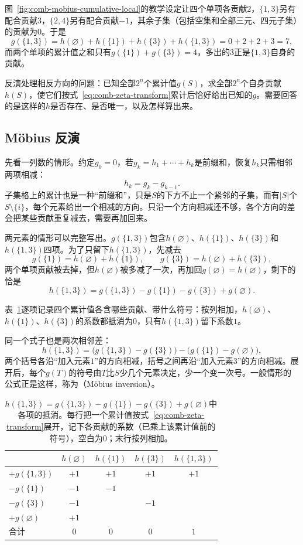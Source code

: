 图~\ref{fig:comb-mobius-cumulative-local}的教学设定让四个单项各贡献$2$，$\{1,3\}$另有配合贡献$3$，$\{2,4\}$另有配合贡献$-1$，其余子集（包括空集和全部三元、四元子集）的贡献为$0$。于是
\[
  g(\{1,3\})=h(\varnothing)+h(\{1\})+h(\{3\})+h(\{1,3\})=0+2+2+3=7,
\]
而两个单项的累计值之和只有$g(\{1\})+g(\{3\})=4$，多出的$3$正是$\{1,3\}$自身的贡献。

反演处理相反方向的问题：已知全部$2^n$个累计值$g(S)$，求全部$2^n$个自身贡献$h(S)$，使它们按式~\eqref{eq:comb-zeta-transform}累计后恰好给出已知的$g$。需要回答的是这样的$h$是否存在、是否唯一，以及怎样算出来。

\subsection{Möbius 反演}
\label{sec:graph-setfn-mobius-inversion}

先看一列数的情形。约定$g_0=0$，若$g_k=h_1+\cdots+h_k$是前缀和，恢复$h_k$只需相邻两项相减：
\[
  h_k=g_k-g_{k-1}.
\]
子集格上的累计也是一种“前缀和”，只是$S$的下方不止一个紧邻的子集，而有$|S|$个$S\setminus\{i\}$，每个元素给出一个相减的方向。只沿一个方向相减还不够，各个方向的差会把某些贡献重复减去，需要再加回来。

两元素的情形可以完整写出。$g(\{1,3\})$包含$h(\varnothing)$、$h(\{1\})$、$h(\{3\})$和$h(\{1,3\})$四项。为了只留下$h(\{1,3\})$，先减去
\[
  g(\{1\})=h(\varnothing)+h(\{1\}),\qquad g(\{3\})=h(\varnothing)+h(\{3\}),
\]
两个单项贡献被去掉，但$h(\varnothing)$被多减了一次，再加回$g(\varnothing)=h(\varnothing)$，剩下的恰是
\[
  h(\{1,3\})=g(\{1,3\})-g(\{1\})-g(\{3\})+g(\varnothing).
\]

表~\ref{tab:graph-setfn-mobius-cancellation}逐项记录四个累计值各含哪些贡献、带什么符号：按列相加，$h(\varnothing)$、$h(\{1\})$、$h(\{3\})$的系数都抵消为$0$，只有$h(\{1,3\})$留下系数$1$。

同一个式子也是两次相邻差：
\[
  h(\{1,3\})=\bigl(g(\{1,3\})-g(\{3\})\bigr)-\bigl(g(\{1\})-g(\varnothing)\bigr),
\]
两个括号各沿“加入元素$1$”的方向相减，括号之间再沿“加入元素$3$”的方向相减。展开后，每个$g(T)$的符号由$T$比$S$少几个元素决定，少一个变一次号。一般情形的公式正是这样，称为（Möbius inversion）。

\begin{table}[!htb]
  \centering
  \begin{tabular}{@{}lcccc@{}}
    \toprule
    & $h(\varnothing)$ & $h(\{1\})$ & $h(\{3\})$ & $h(\{1,3\})$ \\
    \midrule
    $+g(\{1,3\})$ & $+1$ & $+1$ & $+1$ & $+1$ \\
    $-g(\{1\})$ & $-1$ & $-1$ & & \\
    $-g(\{3\})$ & $-1$ & & $-1$ & \\
    $+g(\varnothing)$ & $+1$ & & & \\
    \midrule
    合计 & $0$ & $0$ & $0$ & $1$ \\
    \bottomrule
  \end{tabular}
  \caption{$h(\{1,3\})=g(\{1,3\})-g(\{1\})-g(\{3\})+g(\varnothing)$中各项的抵消。每行把一个累计值按式~\eqref{eq:comb-zeta-transform}展开，记下各贡献的系数（已乘上该累计值前的符号），空白为$0$；末行按列相加。}
  \label{tab:graph-setfn-mobius-cancellation}
\end{table}


